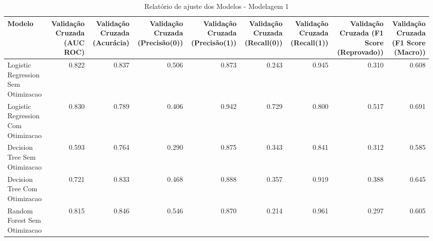 \begin{table}[H] %
    \centering
    \caption{Relatório de ajuste dos Modelos - Modelagem 1}
    \label{tab:relatorio_ajuste_modelagem_1}
    \renewcommand{\arraystretch}{1.25} %
    \begin{adjustwidth}{ -1in }{ -1in } %
    \centering %
    \small %
    \begin{tabular}{lrrrrrrrr}
\toprule
                            Modelo &  Validação Cruzada (AUC ROC) &  Validação Cruzada (Acurácia) &  Validação Cruzada (Precisão(0)) &  Validação Cruzada (Precisão(1)) &  Validação Cruzada (Recall(0)) &  Validação Cruzada (Recall(1)) &  Validação Cruzada (F1 Score (Reprovado)) &  Validação Cruzada (F1 Score (Macro)) \\
\midrule
Logistic Regression Sem Otimizacao &                        0.822 &                         0.837 &                            0.506 &                            0.873 &                          0.243 &                          0.945 &                                     0.310 &                                 0.608 \\
Logistic Regression Com Otimizacao &                        0.830 &                         0.789 &                            0.406 &                            0.942 &                          0.729 &                          0.800 &                                     0.517 &                                 0.691 \\
      Decision Tree Sem Otimizacao &                        0.593 &                         0.764 &                            0.290 &                            0.875 &                          0.343 &                          0.841 &                                     0.312 &                                 0.585 \\
      Decision Tree Com Otimizacao &                        0.721 &                         0.833 &                            0.468 &                            0.888 &                          0.357 &                          0.919 &                                     0.388 &                                 0.645 \\
      Random Forest Sem Otimizacao &                        0.815 &                         0.846 &                            0.546 &                            0.870 &                          0.214 &                          0.961 &                                     0.297 &                                 0.605 \\

\end{tabular}
\end{adjustwidth}
\end{table}
